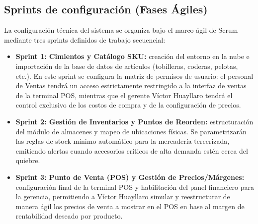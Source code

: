 \subsection{Sprints de configuración (Fases Ágiles)}
\begin{indentedsubsection}
La configuración técnica del sistema se organiza bajo el marco ágil de Scrum mediante tres sprints definidos de trabajo secuencial:

\begin{itemize}
    \item \textbf{Sprint 1: Cimientos y Catálogo SKU:} creación del entorno en la nube e importación de la base de datos de artículos (tobilleras, coderas, pelotas, etc.). En este sprint se configura la matriz de permisos de usuario: el personal de Ventas tendrá un acceso estrictamente restringido a la interfaz de ventas de la terminal POS, mientras que el gerente Víctor Huayllaro tendrá el control exclusivo de los costos de compra y de la configuración de precios.
    \item \textbf{Sprint 2: Gestión de Inventarios y Puntos de Reorden:} estructuración del módulo de almacenes y mapeo de ubicaciones físicas. Se parametrizarán las reglas de stock mínimo automático para la mercadería tercerizada, emitiendo alertas cuando accesorios críticos de alta demanda estén cerca del quiebre.
    \item \textbf{Sprint 3: Punto de Venta (POS) y Gestión de Precios/Márgenes:} configuración final de la terminal POS y habilitación del panel financiero para la gerencia, permitiendo a Víctor Huayllaro simular y reestructurar de manera ágil los precios de venta a mostrar en el POS en base al margen de rentabilidad deseado por producto.
\end{itemize}
\end{indentedsubsection}
